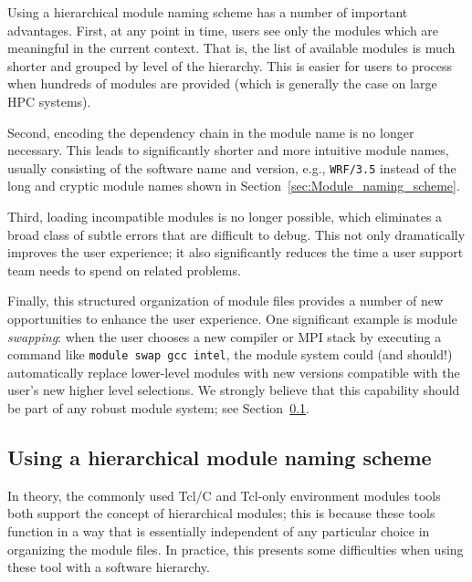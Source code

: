 
Using a hierarchical module naming scheme has a number of important
advantages. First, at any point in time, users see only the
modules which are meaningful in the current context. That is, the list of
available modules is much shorter and grouped by level of the hierarchy. This is easier for users to process when hundreds of modules are
provided (which is generally the case on large HPC systems).

Second, encoding the dependency chain in the module name is no longer
necessary. This leads to significantly shorter and more intuitive
module names, usually consisting of the software name and version, e.g.,
\texttt{\small WRF/3.5} instead of the long and cryptic module names shown in
Section~\ref{sec:Module_naming_scheme}.

Third, loading incompatible
modules is no longer possible, which eliminates a broad class of subtle errors that
are difficult to debug. This not only dramatically improves the user experience; it
also significantly reduces the time a user support team needs to spend on related
problems.

Finally, this structured organization of module files provides
a number of new opportunities to enhance the user experience. One significant
example is module \emph{swapping}: when the user chooses a new compiler or MPI
stack by executing a command like \texttt{\small module swap gcc intel}, the module
system could (and should!) automatically replace lower-level modules with new
versions compatible with the user's new higher level selections. We strongly believe
that this capability should be part of any robust module system; see
Section~\ref{sec:using_a_hierarchy}.


\subsection{Using a hierarchical module naming scheme}
\label{sec:using_a_hierarchy}

In theory, the commonly used Tcl/C and Tcl-only environment modules tools both
support the concept of hierarchical modules; this is because these tools function
in a way that is essentially independent of any particular choice in organizing the
module files. In practice, this presents some difficulties when using these tool
with a software hierarchy.

